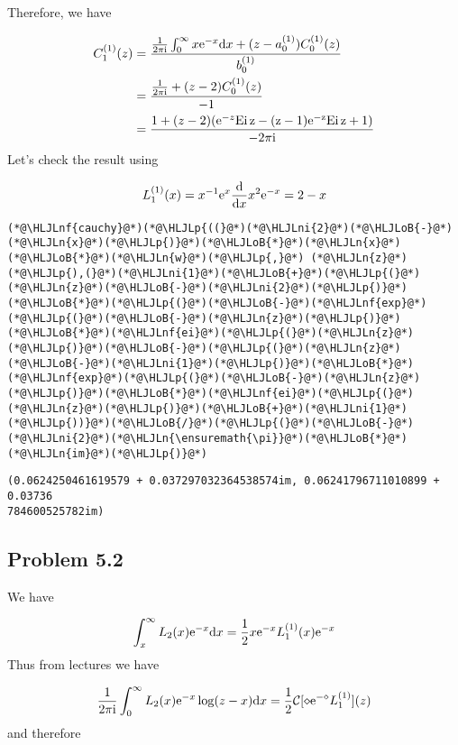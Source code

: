 \documentclass[12pt,landscape]{article}
\newcommand{\HLJLn}[1]{#1}
\newcommand{\HLJLnf}[1]{\textcolor[RGB]{66,102,213}{#1}}
\newcommand{\HLJLni}[1]{\textcolor[RGB]{59,151,46}{#1}}
\newcommand{\HLJLoB}[1]{\textcolor[RGB]{102,102,102}{\textbf{#1}}}
\newcommand{\HLJLp}[1]{#1}
\def\D{ {\rm d} }
\def\I{ {\rm i} }
\def\E{ {\rm e} }
\def\CC{ {\cal C} }
\def\Ei{ {\rm Ei}\, }
\def\dx{\D x}
\def\Ei{\rm Ei\,}
\begin{document}
{Therefore, we have


\begin{align*}
C_1^{(1)}(z) &= {{1 \over 2 \pi \I} \int_0^\infty x \E^{-x} \dx + (z-a_0^{(1)}) C_0^{(1)}(z) \over b_0^{(1)}} \\
&=  {{1 \over 2 \pi \I}  + (z-2) C_0^{(1)}(z) \over -1}\\
&=  {1  + (z-2) (\E^{-z} \Ei z - (z-1) \E^{-z} \Ei z +1) \over -2 \pi \I}
\end{align*}
Let's check the result using

\[
L_1^{(1)}(x) = x^{-1} \E^x {\D \over \dx} x^2 \E^{-x} = 2 - x
\]

\begin{lstlisting}
(*@\HLJLnf{cauchy}@*)(*@\HLJLp{((}@*)(*@\HLJLni{2}@*)(*@\HLJLoB{-}@*)(*@\HLJLn{x}@*)(*@\HLJLp{)}@*)(*@\HLJLoB{*}@*)(*@\HLJLn{x}@*)(*@\HLJLoB{*}@*)(*@\HLJLn{w}@*)(*@\HLJLp{,}@*) (*@\HLJLn{z}@*)(*@\HLJLp{),(}@*)(*@\HLJLni{1}@*)(*@\HLJLoB{+}@*)(*@\HLJLp{(}@*)(*@\HLJLn{z}@*)(*@\HLJLoB{-}@*)(*@\HLJLni{2}@*)(*@\HLJLp{)}@*)(*@\HLJLoB{*}@*)(*@\HLJLp{(}@*)(*@\HLJLoB{-}@*)(*@\HLJLnf{exp}@*)(*@\HLJLp{(}@*)(*@\HLJLoB{-}@*)(*@\HLJLn{z}@*)(*@\HLJLp{)}@*)(*@\HLJLoB{*}@*)(*@\HLJLnf{ei}@*)(*@\HLJLp{(}@*)(*@\HLJLn{z}@*)(*@\HLJLp{)}@*)(*@\HLJLoB{-}@*)(*@\HLJLp{(}@*)(*@\HLJLn{z}@*)(*@\HLJLoB{-}@*)(*@\HLJLni{1}@*)(*@\HLJLp{)}@*)(*@\HLJLoB{*}@*)(*@\HLJLnf{exp}@*)(*@\HLJLp{(}@*)(*@\HLJLoB{-}@*)(*@\HLJLn{z}@*)(*@\HLJLp{)}@*)(*@\HLJLoB{*}@*)(*@\HLJLnf{ei}@*)(*@\HLJLp{(}@*)(*@\HLJLn{z}@*)(*@\HLJLp{)}@*)(*@\HLJLoB{+}@*)(*@\HLJLni{1}@*)(*@\HLJLp{))}@*)(*@\HLJLoB{/}@*)(*@\HLJLp{(}@*)(*@\HLJLoB{-}@*)(*@\HLJLni{2}@*)(*@\HLJLn{\ensuremath{\pi}}@*)(*@\HLJLoB{*}@*)(*@\HLJLn{im}@*)(*@\HLJLp{)}@*)
\end{lstlisting}

\begin{lstlisting}
(0.0624250461619579 + 0.037297032364538574im, 0.06241796711010899 + 0.03736
784600525782im)
\end{lstlisting}


\subsection{Problem 5.2}
We have

\[
\int_x^\infty L_2(x) \E^{-x} \dx = {1 \over 2} x \E^{-x} L_1^{(1)}(x) \E^{-x}
\]
Thus from lectures we have

\[
{1 \over 2 \pi\I} \int_0^\infty L_2(x) \E^{-x} \log(z-x) \dx = {1 \over 2}\CC[ \diamond \E^{-\diamond} L_1^{(1)}](z)
\]
and therefore

}
\end{document}
